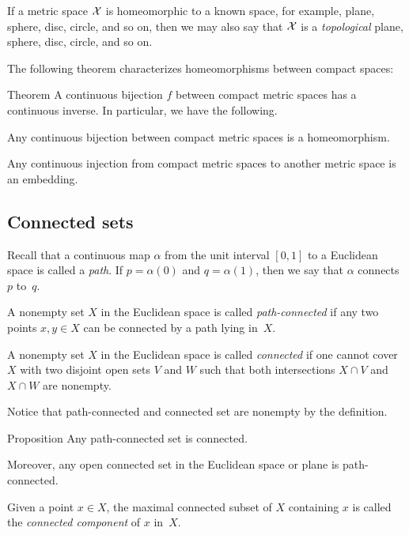 \begin{multicols}{2}
{If a metric space $\mathcal{X}$ is homeomorphic to a known space, for example, plane, sphere, disc, circle, and so on,
then we may also say that $\mathcal{X}$ is a \emph{topological} plane, sphere, disc, circle, and so on.

The following theorem characterizes homeomorphisms between compact spaces:

\begin{thm}{Theorem}\label{thm:Hausdorff-compact}
A continuous bijection $f$ between compact metric spaces has a continuous inverse.
In particular, we have the following.

\begin{subthm}{}
Any continuous bijection between compact metric spaces
is a homeomorphism.
\end{subthm}

\begin{subthm}{}
Any continuous injection from compact metric spaces to another metric space
is an embedding.
\end{subthm}


\end{thm}

\subsection*{Connected sets}

Recall that a continuous map $\alpha$ from the unit interval $[0,1]$ to a Euclidean space is called a \emph{path}.
If $p=\alpha (0)$ and $q = \alpha (1)$, then we say that $\alpha$ connects $p$ to~$q$.

A nonempty set $X$ in the Euclidean space is called \emph{path-connected} if any two points $x,y\in X$ can be connected by a path lying in~$X$.

A nonempty set $X$ in the Euclidean space is called \emph{connected} if one cannot cover $X$ with two disjoint open sets $V$ and $W$ such that both intersections $X\cap V$ and $X\cap W$ are nonempty.

Notice that path-connected and connected set are nonempty by the definition.

\begin{thm}{Proposition}
Any path-connected set is connected.

Moreover, any open connected set in the Euclidean space or plane is path-connected.
\end{thm}

Given a point $x\in X$, the maximal connected subset of $X$ containing $x$ is called the {}\emph{connected component} of $x$ in~$X$.

}
\end{multicols}
